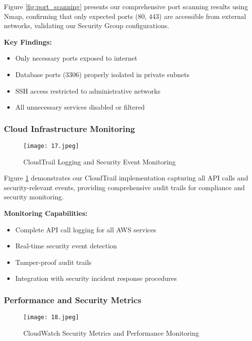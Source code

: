 \documentclass[12pt]{article}
\begin{document}
Figure \ref{fig:port_scanning} presents our comprehensive port scanning results using Nmap, confirming that only expected ports (80, 443) are accessible from external networks, validating our Security Group configurations.

\textbf{Key Findings:}
\begin{itemize}
\item Only necessary ports exposed to internet
\item Database ports (3306) properly isolated in private subnets
\item SSH access restricted to administrative networks
\item All unnecessary services disabled or filtered
\end{itemize}

\subsubsection{Cloud Infrastructure Monitoring}

\begin{figure}[H]
\centering
\texttt{[image: 17.jpeg]}
\caption{CloudTrail Logging and Security Event Monitoring}
\label{fig:cloudtrail_logs}
\end{figure}

Figure \ref{fig:cloudtrail_logs} demonstrates our CloudTrail implementation capturing all API calls and security-relevant events, providing comprehensive audit trails for compliance and security monitoring.

\textbf{Monitoring Capabilities:}
\begin{itemize}
\item Complete API call logging for all AWS services
\item Real-time security event detection
\item Tamper-proof audit trails
\item Integration with security incident response procedures
\end{itemize}

\subsubsection{Performance and Security Metrics}

\begin{figure}[H]
\centering
\texttt{[image: 18.jpeg]}
\caption{CloudWatch Security Metrics and Performance Monitoring}
\label{fig:cloudwatch_metrics}
\end{figure}
\end{document}
